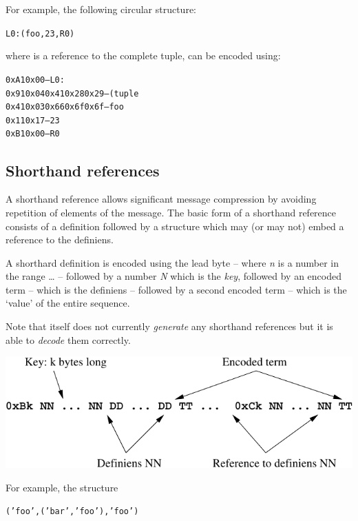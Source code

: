 For example, the following circular structure:

\begin{alltt}
L0: (foo, 23, R0)
\end{alltt}

where  is a reference to the complete tuple, can be encoded using:
\begin{alltt}
0xA1 0x00                                      -- L0:
     0x91 0x04 0x41 0x28 0x29                  -- ( tuple
               0x41 0x03 0x66 0x6f 0x6f        -- foo
               0x11 0x17                       -- 23
               0xB1 0x00                       -- R0
\end{alltt}

\subsection{Shorthand references}
\label{encoded:short}

A shorthand reference allows significant message compression by avoiding repetition of elements of the message. The basic form of a shorthand reference consists of a definition followed by a structure which may (or may not) embed a reference to the definiens.

A shorthard definition is encoded using the lead byte  -- where \emph{n} is a number in the range \ldots{} -- followed by a number \emph{N} which is the \emph{key}, followed by an encoded term -- which is the definiens -- followed by a second encoded term -- which is the `value' of the entire sequence.

Note that \go itself does not currently \emph{generate} any shorthand references but it is able to \emph{decode} them correctly.


\includegraphics{shorthand}

For example, the structure

\begin{alltt}
('foo', ('bar', 'foo'), 'foo')
\end{alltt}

